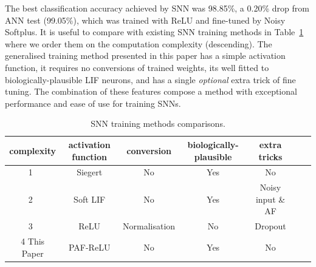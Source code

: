 \documentclass{article}
\begin{document}
The best classification accuracy achieved by SNN was 98.85\%, a 0.20\% drop from ANN test (99.05\%), which was trained with ReLU and fine-tuned by Noisy Softplus.
It is useful to compare with existing SNN training methods in Table~\ref{tbl:compare} where we order them on the computation complexity (descending).   
The generalised training method presented in this paper has a simple activation function, it requires no conversions of trained weights, its well fitted to biologically-plausible LIF neurons, and has a single \emph{optional} extra trick of fine tuning. The combination of these features compose a method with exceptional performance and ease of use for training SNNs.


\begin{table}[thb]
	\centering
	\caption{\label{tbl:compare}SNN training methods comparisons.}
	\bgroup
	\def\arraystretch{1.4}
	\begin{tabular}{c c c c c c c}
		complexity & activation function & conversion & biologically-plausible  & extra tricks \\
		\hline
	 	1~\cite{Jug_etal_2012} & Siegert & No & Yes & No \\
	 	2~\cite{hunsberger2015spiking} & Soft LIF & No & Yes & Noisy input \& AF\\
	 	3~\cite{diehl2015fast} & ReLU & Normalisation & No & Dropout \\
	 	4 This Paper & PAF-ReLU & No & Yes & No 
	\end{tabular}
	\egroup
\end{table}

\end{document}
